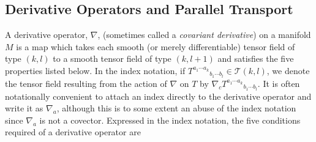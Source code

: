 
\subsection{Derivative Operators and Parallel Transport}\label{sec:3.1}

A derivative operator, $\nabla$, (sometimes called a \emph{covariant derivative}) on a manifold
$M$ is a map which takes each smooth (or merely differentiable) tensor field of type
$(k,l)$ to a smooth tensor field of type $(k,l+1)$ and satisfies the five properties listed
below. In the index notation, if $T^{a_1\cdots a_k}{}_{b_1\cdots b_l}\in\mathcal T(k,l)$, we denote the tensor field
resulting from the action of $\nabla$ on $T$ by
$\nabla_cT^{a_1\cdots a_k}{}_{b_1\cdots b_l}$. It is often notationally convenient to attach an
index directly to the derivative operator and write it as $\nabla_a$, although this is to
some extent an abuse of the index notation since $\nabla_a$ is not a covector. Expressed
in the index notation, the five conditions required of a derivative operator are

